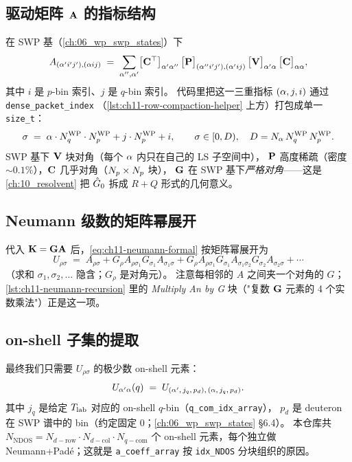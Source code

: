 \subsection{驱动矩阵 \texorpdfstring{$\mathbf{A}$}{A} 的指标结构}
\label{subsec:ch11-A-index}
在 SWP 基（\cref{ch:06_wp_swp_states}）下
\begin{equation}
\label{eq:ch11-A-def}
A_{(\alpha' i' j'),(\alpha i j)}
\;=\;
\sum_{\alpha'', \alpha'}
\bigl[\mathbf{C}^\top\bigr]_{\alpha' \alpha''}\,
\bigl[\mathbf{P}\bigr]_{(\alpha'' i' j'),(\alpha' i j)}\,
\bigl[\mathbf{V}\bigr]_{\alpha' \alpha}\,
\bigl[\mathbf{C}\bigr]_{\alpha \alpha},
\end{equation}
其中 \(i\) 是 \(p\)-bin 索引、\(j\) 是 \(q\)-bin 索引。
代码里把这一三重指标 \((\alpha, j, i)\) 通过 \texttt{dense\_packet\_index}
（\cref{lst:ch11-row-compaction-helper} 上方）打包成单一 \texttt{size\_t}：
\begin{equation}
\label{eq:ch11-flat-idx}
\sigma \;=\; \alpha \cdot {N_{q}^{\text{WP}}} \cdot {N_{p}^{\text{WP}}} + j\cdot{N_{p}^{\text{WP}}} + i,
\qquad
\sigma \in [0, D),\quad D = N_\alpha\,{N_{q}^{\text{WP}}}\,{N_{p}^{\text{WP}}}.
\end{equation}
SWP 基下 \(\mathbf{V}\) 块对角（每个 \(\alpha\) 内只在自己的 LS 子空间中），
\(\mathbf{P}\) 高度稀疏（密度 \(\sim 0.1\%\)），\(\mathbf{C}\) 几乎对角（\(N_p\times N_p\) 块），
\(\mathbf{G}\) 在 SWP 基下\emph{严格对角}——这是
\cref{ch:10_resolvent} 把 \(\hat{G}_0\) 拆成 \(R + Q\)
形式的几何意义。

\subsection{Neumann 级数的矩阵幂展开}
\label{subsec:ch11-neumann-mat-expansion}
代入 \(\mathbf{K} = \mathbf{G}\mathbf{A}\) 后，\cref{eq:ch11-neumann-formal}
按矩阵幂展开为
\begin{equation}
\label{eq:ch11-neumann-mat}
U_{\rho\sigma}
\;=\;
A_{\rho\sigma}
+ G_\rho A_{\rho\sigma_1} G_{\sigma_1} A_{\sigma_1 \sigma}
+ G_\rho A_{\rho\sigma_1} G_{\sigma_1} A_{\sigma_1\sigma_2} G_{\sigma_2} A_{\sigma_2\sigma}
+ \cdots
\end{equation}
（求和 \(\sigma_1, \sigma_2, \ldots\) 隐含；\(G_\rho\) 是对角元）。
注意每相邻的 \(A\) 之间夹一个对角的 \(G\)；\cref{lst:ch11-neumann-recursion}
里的 \emph{Multiply An by G} 块（"复数 \(\mathbf{G}\) 元素的 4 个实数乘法"）正是这一项。

\subsection{on-shell 子集的提取}
\label{subsec:ch11-on-shell-extract}
最终我们只需要 \(U_{\rho\sigma}\) 的极少数 on-shell 元素：
\begin{equation}
\label{eq:ch11-on-shell-subset}
U_{\alpha'\alpha}(q)
\;=\;
U_{(\alpha',\, j_q,\, p_d),\,(\alpha,\, j_q,\, p_d)}.
\end{equation}
其中 \(j_q\) 是给定 \({T_{\text{lab}}}\) 对应的 on-shell \(q\)-bin（\texttt{q\_com\_idx\_array}），
\(p_d\) 是 deuteron 在 SWP 谱中的 bin（约定固定 0；\cref{ch:06_wp_swp_states} §6.4）。
本仓库共 \(N_{\text{NDOS}} = N_{d-\text{row}} \cdot N_{d-\text{col}} \cdot N_{q-\text{com}}\)
个 on-shell 元素，每个独立做 Neumann+Padé；这就是 \texttt{a\_coeff\_array}
按 \texttt{idx\_NDOS} 分块组织的原因。

